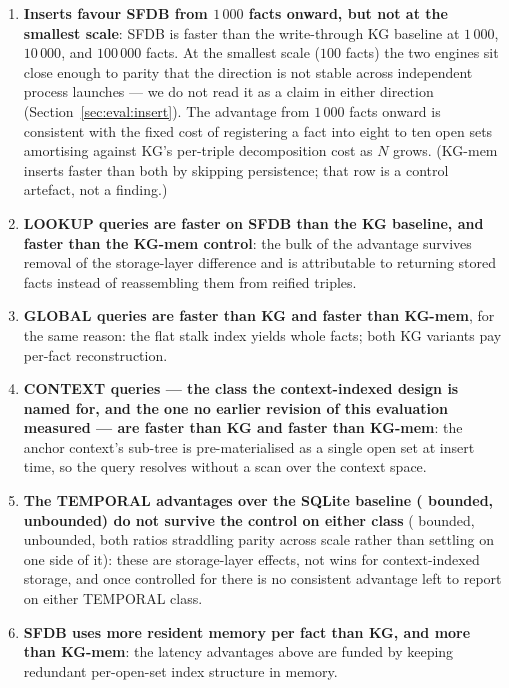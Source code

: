 \begin{enumerate}
    \item \textbf{Inserts favour SFDB from $1\,000$ facts onward, but
          not at the smallest scale}: SFDB is \rangeinsertkg{} faster
          than the write-through KG baseline at $1\,000$, $10\,000$,
          and $100\,000$ facts. At the smallest scale ($100$ facts) the
          two engines sit close enough to parity that the direction is
          not stable across independent process launches --- we do not
          read it as a claim in either direction
          (Section~\ref{sec:eval:insert}). The advantage from $1\,000$
          facts onward is consistent with the fixed cost of registering
          a fact into eight to ten open sets amortising against KG's
          per-triple decomposition cost as $N$ grows.
          (KG-mem inserts faster than both by
          skipping persistence; that row is a control artefact, not a
          finding.)

    \item \textbf{LOOKUP queries are \rangelookupkg{} faster on SFDB
          than the KG baseline, and \rangelookupkgmem{} faster than the
          KG-mem control}: the bulk of the advantage survives removal of
          the storage-layer difference and is attributable to returning
          stored facts instead of reassembling them from reified
          triples.

    \item \textbf{GLOBAL queries are \rangeglobalkg{} faster than KG
          and \rangeglobalkgmem{} faster than KG-mem}, for the same
          reason: the flat stalk index yields whole facts; both KG
          variants pay per-fact reconstruction.

    \item \textbf{CONTEXT queries --- the class the context-indexed
          design is named for, and the one no earlier revision of this
          evaluation measured --- are \rangecontextkg{} faster than KG
          and \rangecontextkgmem{} faster than KG-mem}: the anchor
          context's sub-tree is pre-materialised as a single open set at
          insert time, so the query resolves without a scan over the
          context space.

    \item \textbf{The TEMPORAL advantages over the SQLite baseline
          (\rangetemporalkg{} bounded, \rangetemporalunbkg{} unbounded)
          do not survive the control on either class}
          (\rangetemporalkgmem{} bounded, \rangetemporalunbkgmem{}
          unbounded, both ratios straddling parity across scale rather
          than settling on one side of it): these are storage-layer
          effects, not wins for context-indexed
          storage, and once controlled for there is no consistent
          advantage left to report on either TEMPORAL class.

    \item \textbf{SFDB uses \rangememkg{} more resident memory per fact
          than KG, and \rangememkgmem{} more than KG-mem}: the latency
          advantages above are funded by keeping redundant per-open-set
          index structure in memory.
\end{enumerate}

